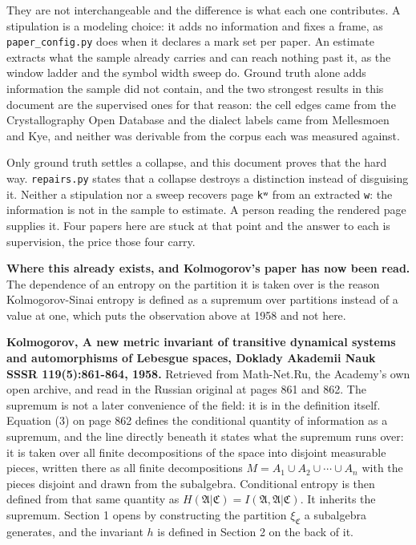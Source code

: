 They are not interchangeable and the difference is what each one contributes. A stipulation is a modeling choice: it adds no information and fixes a frame, as \texttt{paper\_\allowbreak{}config.\allowbreak{}py} does when it declares a mark set per paper. An estimate extracts what the sample already carries and can reach nothing past it, as the window ladder and the symbol width sweep do. Ground truth alone adds information the sample did not contain, and the two strongest results in this document are the supervised ones for that reason: the cell edges came from the Crystallography Open Database and the dialect labels came from Mellesmoen and Kye, and neither was derivable from the corpus each was measured against.

Only ground truth settles a collapse, and this document proves that the hard way. \texttt{repairs.\allowbreak{}py} states that a collapse destroys a distinction instead of disguising it. Neither a stipulation nor a sweep recovers page \texttt{kʷ} from an extracted \texttt{w}: the information is not in the sample to estimate. A person reading the rendered page supplies it. Four papers here are stuck at that point and the answer to each is supervision, the price those four carry.

\textbf{Where this already exists, and Kolmogorov's paper has now been read.} The dependence of an entropy on the partition it is taken over is the reason Kolmogorov-Sinai entropy is defined as a supremum over partitions instead of a value at one, which puts the observation above at 1958 and not here.

\textbf{Kolmogorov, A new metric invariant of transitive dynamical systems and automorphisms of Lebesgue spaces, Doklady Akademii Nauk SSSR 119(5):861-864, 1958.} Retrieved from Math-Net.Ru, the Academy's own open archive, and read in the Russian original at pages 861 and 862. The supremum is not a later convenience of the field: it is in the definition itself. Equation (3) on page 862 defines the conditional quantity of information as a supremum, and the line directly beneath it states what the supremum runs over: it is taken over all finite decompositions of the space into disjoint measurable pieces, written there as all finite decompositions \(M = A_1 \cup A_2 \cup \cdots \cup A_n\) with the pieces disjoint and drawn from the subalgebra. Conditional entropy is then defined from that same quantity as \(H(\mathfrak{A}|\mathfrak{C}) = I(\mathfrak{A}, \mathfrak{A}|\mathfrak{C})\). It inherits the supremum. Section 1 opens by constructing the partition \(\xi_{\mathfrak{C}}\) a subalgebra generates, and the invariant \(h\) is defined in Section 2 on the back of it.

